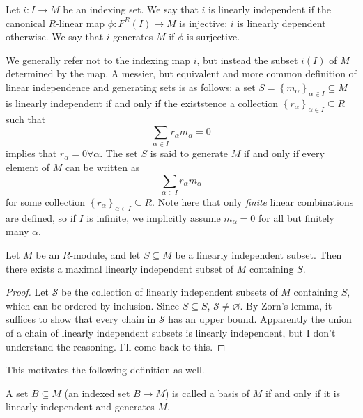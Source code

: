 \begin{definition}\label{dfn:6.1}
	Let $i : I \to M$ be an indexing set. We say that $i$ is linearly independent if the canonical $R$-linear map $\phi : F^R(I) \to M$ is injective; $i$ is linearly dependent otherwise. We say that $i$ generates $M$ if $\phi $ is surjective.
\end{definition}

We generally refer not to the indexing map $i$, but instead the subset $i(I)$ of $M$ determined by the map. A messier, but equivalent and more common definition of linear independence and generating sets is as follows: a set $S=\left\{ m_\alpha  \right\}_{\alpha \in I}\subseteq M $ is linearly independent if and only if the existstence a collection $\left\{ r_\alpha  \right\}_{\alpha \in I} \subseteq R$ such that
\[
	\sum_{\alpha \in I} r_\alpha m_\alpha =0
\]
implies that $r_\alpha =0\forall \alpha $. The set $S$ is said to generate $M$ if and only if every element of $M$ can be written as
\[
	\sum_{\alpha \in I} r_\alpha m_\alpha 
\]
for some collection $\left\{ r_\alpha  \right\}_{\alpha \in I} \subseteq R$. Note here that only \emph{finite} linear combinations are defined, so if $I$ is infinite, we implicitly assume $m_\alpha =0$ for all but finitely many $\alpha $.

\begin{lemma}\label{lma:6.1}
	Let $M$ be an $R$-module, and let $S\subseteq M$ be a linearly independent subset. Then there exists a maximal linearly independent subset of $M$ containing $S$.
\end{lemma}
\begin{proof}
	Let $\mathscr{S} $ be the collection of linearly independent subsets of $M$ containing $S$, which can be ordered by inclusion. Since $S\subseteq S$, $\mathscr{S} \neq \varnothing $. By Zorn's lemma, it suffices to show that every chain in $\mathscr{S} $ has an upper bound. Apparently the union of a chain of linearly independent subsets is linearly independent, but I don't understand the reasoning. I'll come back to this.
\end{proof}

This motivates the following definition as well.
\begin{definition}[Basis]\label{dfn:6.2}
	A set $B\subseteq M$ (an indexed set $B \to M$) is called a basis of $M$ if and only if it is linearly independent and generates $M$.
\end{definition}

